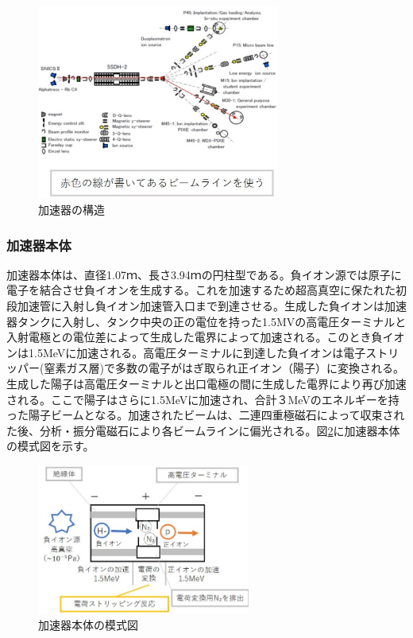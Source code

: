 \documentclass[a4paper,11pt,dvipdfmx]{jsarticle}
\begin{document}
\begin{figure}[H]
    \centering
    \includegraphics[width=80mm]{picture/setup/aclkouzou.png}
    \caption{加速器の構造\cite{beam}}
    \label{aclkouzou}
\end{figure}

\subsubsection{加速器本体}
加速器本体は、直径1.07ｍ、長さ3.94ｍの円柱型である。負イオン源では原子に電子を結合させ負イオンを生成する。これを加速するため超高真空に保たれた初段加速管に入射し負イオン加速管入口まで到達させる。生成した負イオンは加速器タンクに入射し、タンク中央の正の電位を持った1.5MVの高電圧ターミナルと入射電極との電位差によって生成した電界によって加速される。このとき負イオンは1.5MeVに加速される。高電圧ターミナルに到達した負イオンは電子ストリッパー(窒素ガス層)で多数の電子がはぎ取られ正イオン（陽子）に変換される。生成した陽子は高電圧ターミナルと出口電極の間に生成した電界により再び加速される。ここで陽子はさらに1.5MeVに加速され、合計３MeVのエネルギーを持った陽子ビームとなる。加速されたビームは、二連四重極磁石によって収束された後、分析・振分電磁石により各ビームラインに偏光される。図\ref{aclmoshi}に加速器本体の模式図を示す。\cite{syousen}

\begin{figure}[H]
    \centering
    \includegraphics[width=70mm]{picture/setup/aclhonmoshi.png}
    \caption{加速器本体の模式図}
    \label{aclmoshi}
\end{figure}
\end{document}
